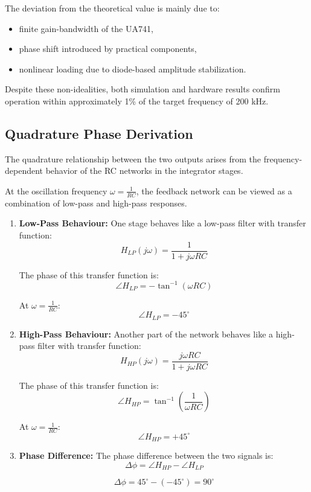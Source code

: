\documentclass[conference]{IEEEtran}
\begin{document}
The deviation from the theoretical value is mainly due to:
\begin{itemize}
\item finite gain-bandwidth of the UA741,
\item phase shift introduced by practical components,
\item nonlinear loading due to diode-based amplitude stabilization.
\end{itemize}

Despite these non-idealities, both simulation and hardware results confirm operation within approximately 1\% of the target frequency of 200 kHz.


\subsection{Quadrature Phase Derivation}

The quadrature relationship between the two outputs arises from the frequency-dependent behavior of the RC networks in the integrator stages.

At the oscillation frequency $\omega = \frac{1}{RC}$, the feedback network can be viewed as a combination of low-pass and high-pass responses.

\begin{enumerate}

\item \textbf{Low-Pass Behaviour:}  
One stage behaves like a low-pass filter with transfer function:
\[
H_{LP}(j\omega) = \frac{1}{1 + j\omega RC}
\]

The phase of this transfer function is:
\[
\angle H_{LP} = -\tan^{-1}(\omega RC)
\]

At $\omega = \frac{1}{RC}$:
\[
\angle H_{LP} = -45^\circ
\]

\item \textbf{High-Pass Behaviour:}  
Another part of the network behaves like a high-pass filter with transfer function:
\[
H_{HP}(j\omega) = \frac{j\omega RC}{1 + j\omega RC}
\]

The phase of this transfer function is:
\[
\angle H_{HP} = \tan^{-1}\left(\frac{1}{\omega RC}\right)
\]

At $\omega = \frac{1}{RC}$:
\[
\angle H_{HP} = +45^\circ
\]

\item \textbf{Phase Difference:}  
The phase difference between the two signals is:
\[
\Delta \phi = \angle H_{HP} - \angle H_{LP}
\]

\[
\Delta \phi = 45^\circ - (-45^\circ) = 90^\circ
\]

\end{enumerate}
\end{document}

